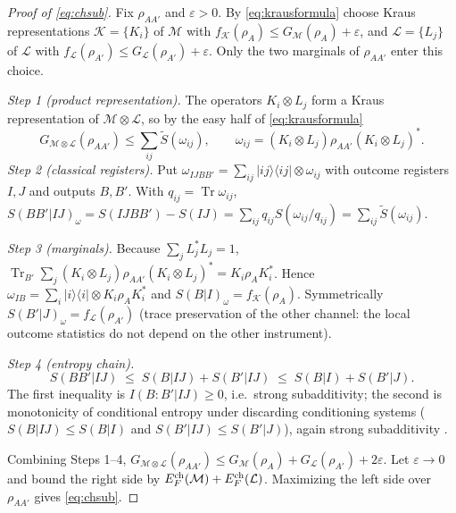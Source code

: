 \documentclass[11pt]{article}
\newcommand{\Tr}{\operatorname{Tr}}
\begin{document}
\begin{proof}[Proof of \eqref{eq:chsub}]
Fix $\rho_{AA'}$ and $\varepsilon>0$. By \eqref{eq:krausformula} choose Kraus representations $\mathcal K=\{K_i\}$ of $\mathcal M$ with $f_{\mathcal K}(\rho_A)\le G_{\mathcal M}(\rho_A)+\varepsilon$, and $\mathcal L=\{L_j\}$ of $\mathcal L$ with $f_{\mathcal L}(\rho_{A'})\le G_{\mathcal L}(\rho_{A'})+\varepsilon$. Only the two marginals of $\rho_{AA'}$ enter this choice.

\emph{Step 1 (product representation).} The operators $K_i\otimes L_j$ form a Kraus representation of $\mathcal M\otimes\mathcal L$, so by the easy half of \eqref{eq:krausformula}
\[
 G_{\mathcal M\otimes\mathcal L}(\rho_{AA'})\le\sum_{ij}\widetilde S(\omega_{ij}),\qquad
 \omega_{ij}=(K_i\otimes L_j)\rho_{AA'}(K_i\otimes L_j)^*.
\]
\emph{Step 2 (classical registers).} Put $\omega_{IJBB'}=\sum_{ij}|ij\rangle\langle ij|\otimes\omega_{ij}$ with outcome registers $I,J$ and outputs $B,B'$. With $q_{ij}=\Tr\omega_{ij}$,
$S(BB'|IJ)_\omega=S(IJBB')-S(IJ)=\sum_{ij}q_{ij}S(\omega_{ij}/q_{ij})=\sum_{ij}\widetilde S(\omega_{ij})$.

\emph{Step 3 (marginals).} Because $\sum_jL_j^*L_j=1$, $\Tr_{B'}\sum_j(K_i\otimes L_j)\rho_{AA'}(K_i\otimes L_j)^*=K_i\rho_AK_i^*$. Hence $\omega_{IB}=\sum_i|i\rangle\langle i|\otimes K_i\rho_AK_i^*$ and $S(B|I)_\omega=f_{\mathcal K}(\rho_A)$. Symmetrically $S(B'|J)_\omega=f_{\mathcal L}(\rho_{A'})$ (trace preservation of the other channel: the local outcome statistics do not depend on the other instrument).

\emph{Step 4 (entropy chain).}
\[
 S(BB'|IJ)\;\le\;S(B|IJ)+S(B'|IJ)\;\le\;S(B|I)+S(B'|J).
\]
The first inequality is $I(B:B'|IJ)\ge0$, i.e.\ strong subadditivity; the second is monotonicity of conditional entropy under discarding conditioning systems ($S(B|IJ)\le S(B|I)$ and $S(B'|IJ)\le S(B'|J)$), again strong subadditivity \cite{ssa}.

Combining Steps 1--4, $G_{\mathcal M\otimes\mathcal L}(\rho_{AA'})\le G_{\mathcal M}(\rho_A)+G_{\mathcal L}(\rho_{A'})+2\varepsilon$. Let $\varepsilon\to0$ and bound the right side by $E_F^{\rm ch}(\mathcal M)+E_F^{\rm ch}(\mathcal L)$. Maximizing the left side over $\rho_{AA'}$ gives \eqref{eq:chsub}.
\end{proof}
\end{document}
